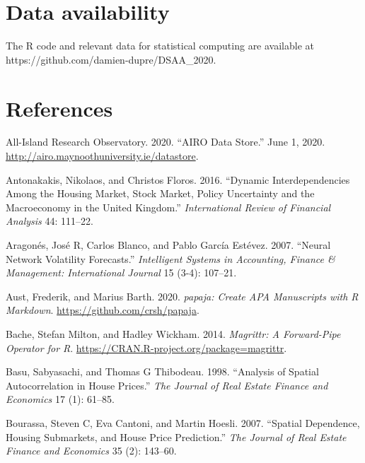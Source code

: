 \documentclass[conference,final,]{IEEEtran}
\newlength{\cslhangindent}
\newenvironment{cslreferences}%
  {\setlength{\parindent}{0pt}%
  \everypar{\setlength{\hangindent}{\cslhangindent}}\ignorespaces}%
  {\par}
\begin{document}
\hypertarget{data-availability}{%
\section{Data availability}\label{data-availability}}

The R code and relevant data for statistical computing are available at https://github.com/damien-dupre/DSAA\_2020.

\hypertarget{references}{%
\section*{References}\label{references}}

\hypertarget{refs}{}
\begin{cslreferences}
\leavevmode\hypertarget{ref-airo2020}{}%
All-Island Research Observatory. 2020. ``AIRO Data Store.'' June 1, 2020. \url{http://airo.maynoothuniversity.ie/datastore}.

\leavevmode\hypertarget{ref-antonakakis2016dynamic}{}%
Antonakakis, Nikolaos, and Christos Floros. 2016. ``Dynamic Interdependencies Among the Housing Market, Stock Market, Policy Uncertainty and the Macroeconomy in the United Kingdom.'' \emph{International Review of Financial Analysis} 44: 111--22.

\leavevmode\hypertarget{ref-aragones2007neural}{}%
Aragonés, José R, Carlos Blanco, and Pablo García Estévez. 2007. ``Neural Network Volatility Forecasts.'' \emph{Intelligent Systems in Accounting, Finance \& Management: International Journal} 15 (3-4): 107--21.

\leavevmode\hypertarget{ref-R-papaja}{}%
Aust, Frederik, and Marius Barth. 2020. \emph{papaja: Create APA Manuscripts with R Markdown}. \url{https://github.com/crsh/papaja}.

\leavevmode\hypertarget{ref-R-magrittr}{}%
Bache, Stefan Milton, and Hadley Wickham. 2014. \emph{Magrittr: A Forward-Pipe Operator for R}. \url{https://CRAN.R-project.org/package=magrittr}.

\leavevmode\hypertarget{ref-basu1998analysis}{}%
Basu, Sabyasachi, and Thomas G Thibodeau. 1998. ``Analysis of Spatial Autocorrelation in House Prices.'' \emph{The Journal of Real Estate Finance and Economics} 17 (1): 61--85.

\leavevmode\hypertarget{ref-bourassa2007spatial}{}%
Bourassa, Steven C, Eva Cantoni, and Martin Hoesli. 2007. ``Spatial Dependence, Housing Submarkets, and House Price Prediction.'' \emph{The Journal of Real Estate Finance and Economics} 35 (2): 143--60.


\end{cslreferences}
\end{document}
